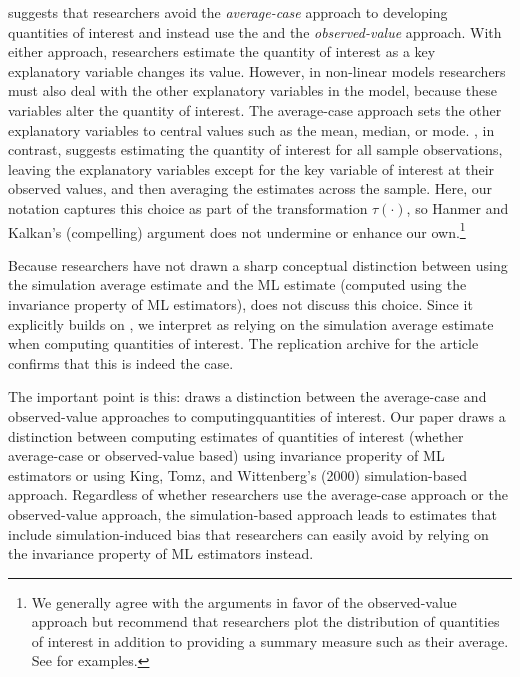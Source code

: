 \documentclass[11pt]{article}
\begin{document}
\cite{HanmerKalkan2013} suggests that researchers avoid the {\it average-case} approach to developing quantities of interest and instead use the and the {\it observed-value} approach.
With either approach, researchers estimate the quantity of interest as a key explanatory variable changes its value.
However, in non-linear models researchers must also deal with the other explanatory variables in the model, because these variables alter the quantity of interest.
The average-case approach sets the other explanatory variables to central values such as the mean, median, or mode.
\cite{HanmerKalkan2013}, in contrast, suggests estimating the quantity of interest for all sample observations, leaving the explanatory variables except for the key variable of interest at their observed values, and then averaging the estimates across the sample.
Here, our notation captures this choice as part of the transformation $\tau(\cdot)$, so Hanmer and Kalkan's (compelling) argument does not undermine or enhance our own.\footnote{We generally agree with the arguments in favor of the observed-value approach but recommend that researchers plot the distribution of quantities of interest in addition to providing a summary measure such as their average. See \cite{AiNorton2003} for examples.}

Because researchers have not drawn a sharp conceptual distinction between using the simulation average estimate and the ML estimate (computed using the invariance property of ML estimators), \cite{HanmerKalkan2013} does not discuss this choice.
Since it explicitly builds on \cite{KingTomzWittenberg2000}, we interpret \cite{HanmerKalkan2013} as relying on the simulation average estimate when computing quantities of interest.
The replication archive for the article confirms that this is indeed the case.

The important point is this: \cite{HanmerKalkan2013} draws a distinction between the average-case and observed-value approaches to computingquantities of interest.
Our paper draws a distinction between computing estimates of quantities of interest (whether average-case or observed-value based) using invariance properity of ML estimators or using King, Tomz, and Wittenberg's (2000) simulation-based approach.
Regardless of whether researchers use the average-case approach or the observed-value approach, the simulation-based approach leads to estimates that include simulation-induced bias that researchers can easily avoid by relying on the invariance property of ML estimators instead.
\end{document}
